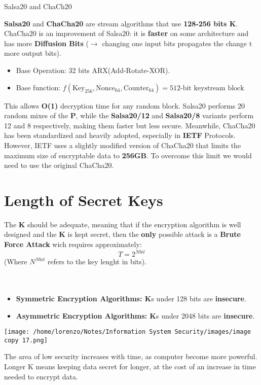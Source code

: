\begin{center}  
\begin{quotebox-grey}{Salsa20 and ChaCh20}

    \textbf{Salsa20} and \textbf{ChaCha20} are stream algorithms that use \textbf{128-256 bits K}. ChaCha20 is an improvement of Salsa20: it is \textbf{faster} on some architecture and has more \textbf{Diffusion Bits} (\(\rightarrow \) changing one input bits propagates the change t more output bits).
    \begin{itemize}
        \item Base Operation: 32 bits ARX(Add-Rotate-XOR).
        \item Base function: \(
        f(\text{Key}_{256}, \text{Nonce}_{64}, \text{Counter}_{64}) = 512 \text{-bit keystream block}
        \)
    \end{itemize}
    This allows \textbf{O(1)} decryption time for any random block. Salsa20 performs 20 random mixes of the \textbf{P}, while the \textbf{Salsa20/12} and \textbf{Salsa20/8} variants perform 12 and 8 respectively, making them faster but less secure. Meanwhile, ChaCha20 has been standardized and heavily adopted, especially in \textbf{IETF} Protocols. However, IETF uses a slightly modified version of ChaCha20
    that limits the maximum size of encryptable data to \textbf{256GB}. To overcome this limit we would need to use the original ChaCha20.
\end{quotebox-grey}
\end{center}

\section{Length of Secret Keys}
The \textbf{K} should be adequate, meaning that if the encryption algorithm is well designed and the \textbf{K} is kept secret, then the \textbf{only} possible attack is a \textbf{Brute Force Attack} wich requires approximately: \[T=2^{Nbit}\]
(Where \(N^{Nbit}\) refers to the key lenght in bits). 
\\
\\
\\
\begin{minipage}{0.6\textwidth}
\begin{itemize}
    \item \textbf{Symmetric Encryption Algorithms: K}s under 128 bits are \textbf{insecure}.
    \item \textbf{Asymmetric Encryption Algorithms: K}s under 2048 bits are \textbf{insecure}.
\end{itemize} 
\end{minipage} 
\hspace{0cm}
\begin{minipage}{0.4\textwidth}
    \centering
    \texttt{[image: /home/lorenzo/Notes/Information System Security/images/image copy 17.png]}
\end{minipage}
\noindent
The area of low security increases with time, as computer become more powerful. Longer K means keeping data secret for longer, at the cost of an increase in time needed to encrypt data.
\newpage
